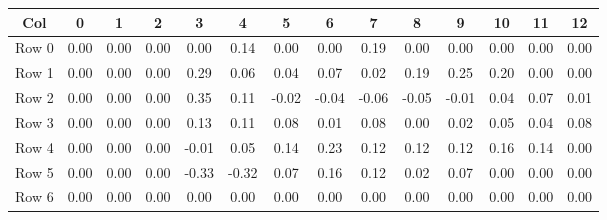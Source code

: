 \documentclass[preview]{standalone}
\begin{document}
\begin{table}[ht]
\centering
\begin{adjustbox}{width=1\textwidth}
\begin{tabular}{|c|c|c|c|c|c|c|c|c|c|c|c|c|c|} 
 \hline
 Col 	 & 0 	 & 1 	 & 2 	 & 3 	 & 4 	 & 5 	 & 6 	 & 7 	 & 8 	 & 9 	 & 10 	 & 11 	 & 12 	 \\ \hline 
Row 0 	 & 0.00 	 & 0.00 	 & 0.00 	 & 0.00 	 & 0.14 	 & 0.00 	 & 0.00 	 & 0.19 	 & 0.00 	 & 0.00 	 & 0.00 	 & 0.00 	 & 0.00 	 \\  \hline
Row 1 	 & 0.00 	 & 0.00 	 & 0.00 	 & 0.29 	 & 0.06 	 & 0.04 	 & 0.07 	 & 0.02 	 & 0.19 	 & 0.25 	 & 0.20 	 & 0.00 	 & 0.00 	 \\  \hline
Row 2 	 & 0.00 	 & 0.00 	 & 0.00 	 & 0.35 	 & 0.11 	 & -0.02 	 & -0.04 	 & -0.06 	 & -0.05 	 & -0.01 	 & 0.04 	 & 0.07 	 & 0.01 	 \\  \hline
Row 3 	 & 0.00 	 & 0.00 	 & 0.00 	 & 0.13 	 & 0.11 	 & 0.08 	 & 0.01 	 & 0.08 	 & 0.00 	 & 0.02 	 & 0.05 	 & 0.04 	 & 0.08 	 \\  \hline
Row 4 	 & 0.00 	 & 0.00 	 & 0.00 	 & -0.01 	 & 0.05 	 & 0.14 	 & 0.23 	 & 0.12 	 & 0.12 	 & 0.12 	 & 0.16 	 & 0.14 	 & 0.00 	 \\  \hline
Row 5 	 & 0.00 	 & 0.00 	 & 0.00 	 & -0.33 	 & -0.32 	 & 0.07 	 & 0.16 	 & 0.12 	 & 0.02 	 & 0.07 	 & 0.00 	 & 0.00 	 & 0.00 	 \\  \hline
Row 6 	 & 0.00 	 & 0.00 	 & 0.00 	 & 0.00 	 & 0.00 	 & 0.00 	 & 0.00 	 & 0.00 	 & 0.00 	 & 0.00 	 & 0.00 	 & 0.00 	 & 0.00 	 \\  \hline
\end{tabular} 
\end{adjustbox} 
\end{table}
\end{document}
